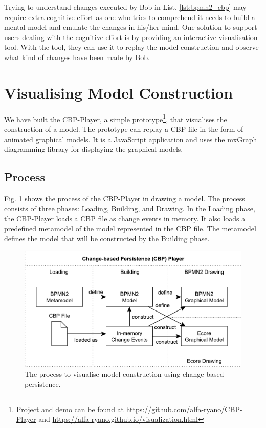 \documentclass[conference]{IEEEtran}
\begin{document}
Trying to understand changes executed by Bob in List. \ref{lst:bpmn2_cbp} may require extra cognitive effort 
as one who tries to comprehend it needs to build a mental model and emulate the changes in his/her mind.
One solution to support users dealing with the cognitive effort is by providing an interactive visualisation tool.
With the tool, they can use it to replay the model construction and observe what kind of changes have been made by Bob.

\section{Visualising Model Construction}
\label{sec:visualising_model_construction}
We have built the CBP-Player, 
a simple prototype\footnote{Project and demo can be found at \url{https://github.com/alfa-ryano/CBP-Player} and \url{https://alfa-ryano.github.io/visualization.html}},
that visualises the construction of a model. The prototype can replay a CBP file in the form of animated graphical models.
It is a JavaScript application and uses the mxGraph diagramming library \cite{mxgraph2019mxgraph} for displaying the graphical models. 

\subsection{Process}
\label{sec:process}
Fig. \ref{fig:process} shows the process of the CBP-Player in drawing a model. 
The process consists of three phases: Loading, Building, and Drawing.  
In the Loading phase, the CBP-Player loads a CBP file as change events in memory. 
It also loads a predefined metamodel of the model represented in the CBP file. 
The metamodel defines the model that will be constructed by the Building phase.

\begin{figure}[h]
    \includegraphics[width=\linewidth]{process}
    \caption{The process to visualise model construction using change-based persistence.}
    \label{fig:process}
\end{figure}
\end{document}

